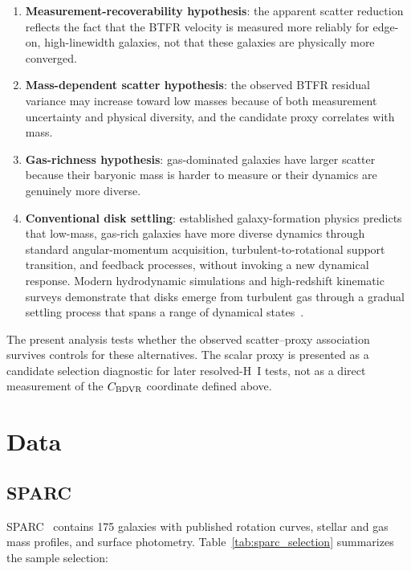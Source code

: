 \documentclass[11pt]{article}
\begin{document}
\begin{enumerate}
\item \textbf{Measurement-recoverability hypothesis}: the apparent scatter reduction reflects the fact that the BTFR velocity is measured more reliably for edge-on, high-linewidth galaxies, not that these galaxies are physically more converged.
\item \textbf{Mass-dependent scatter hypothesis}: the observed BTFR residual variance may increase toward low masses because of both measurement uncertainty and physical diversity, and the candidate proxy correlates with mass.
\item \textbf{Gas-richness hypothesis}: gas-dominated galaxies have larger scatter because their baryonic mass is harder to measure or their dynamics are genuinely more diverse.
\item \textbf{Conventional disk settling}: established galaxy-formation physics predicts that low-mass, gas-rich galaxies have more diverse dynamics through standard angular-momentum acquisition, turbulent-to-rotational support transition, and feedback processes, without invoking a new dynamical response. Modern hydrodynamic simulations and high-redshift kinematic surveys demonstrate that disks emerge from turbulent gas through a gradual settling process that spans a range of dynamical states~\cite{pillepich2019, wisnioski2015}.
\end{enumerate}

The present analysis tests whether the observed scatter--proxy association survives controls for these alternatives. The scalar proxy is presented as a candidate selection diagnostic for later resolved-H~I tests, not as a direct measurement of the $C_{\rm BDVR}$ coordinate defined above.

\section{Data}

\subsection{SPARC}

SPARC~\cite{lelli2016} contains 175 galaxies with published rotation curves, stellar and gas mass profiles, and surface photometry. Table~\ref{tab:sparc_selection} summarizes the sample selection:
\end{document}
